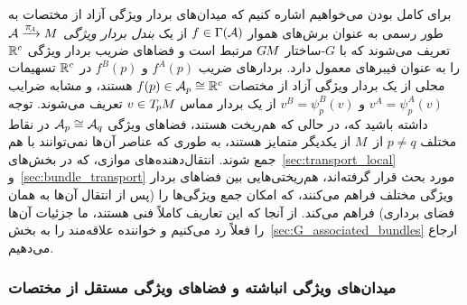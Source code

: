 				
				برای کامل بودن می‌خواهیم اشاره کنیم که میدان‌های بردار ویژگی آزاد از مختصات به طور رسمی به عنوان برش‌های هموار $f\in\Gamma(\mathcal{A})$ از یک \emph{بندل بردار ویژگی} $\A\piAarrow M$ تعریف می‌شوند که با $G$-ساختار $G\mkern-1.4muM$ مرتبط است و فضاهای ضریب بردار ویژگی $\mathbb{R}^c$ را به عنوان فیبرهای معمول دارد.
				بردارهای ضریب $f^A(p)$ و $f^B(p)$ در $\mathbb{R}^c$ تسهیمات محلی از یک بردار ویژگی آزاد از مختصات $f(p) \in \mathcal{A}_p \cong \mathbb{R}^c$ هستند، و مشابه ضرایب $v^A=\psi_p^A(v)$ و $v^B=\psi_p^B(v)$ از یک بردار مماس $v\in T_{\mkern-1.5mu p}\mkern-.5muM$ تعریف می‌شوند.
				توجه داشته باشید که، در حالی که هم‌ریخت هستند، فضاهای ویژگی $\mathcal{A}_p \cong \mathcal{A}_q$ در نقاط مختلف $p\neq q$ از~$M$ از یکدیگر متمایز هستند، به طوری که عناصر آن‌ها نمی‌توانند با هم جمع شوند.
				انتقال‌دهنده‌های موازی، که در بخش‌های~\ref{sec:transport_local} و~\ref{sec:bundle_transport} مورد بحث قرار گرفته‌اند، هم‌ریختی‌هایی بین فضاهای بردار ویژگی مختلف فراهم می‌کنند، که امکان جمع ویژگی‌ها را (پس از انتقال آن‌ها به همان فضای برداری) فراهم می‌کند.
				از آنجا که این تعاریف کاملاً فنی هستند، ما جزئیات آن‌ها را فعلاً رد می‌کنیم و خواننده علاقه‌مند را به بخش~\ref{sec:G_associated_bundles} ارجاع می‌دهیم.
				
				
				
				
				
				
				
				
\subsubsection{میدان‌های ویژگی انباشته و فضاهای ویژگی مستقل از مختصات}
\label{sec:stacked_fields}

